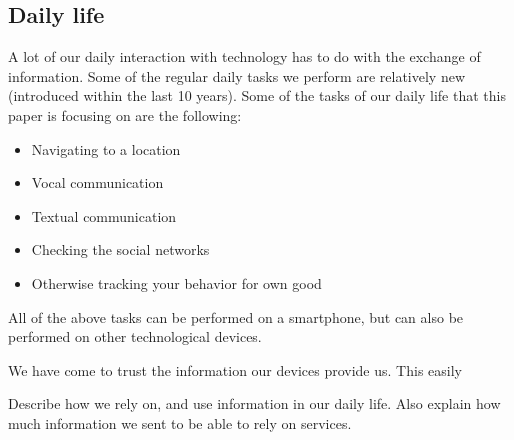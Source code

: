 \subsection{Daily life}
A lot of our daily interaction with technology has to do with the exchange of information. Some of the regular daily tasks we perform are relatively new (introduced within the last 10 years). Some of the tasks of our daily life that this paper is focusing on are the following:
\begin{itemize}
  \item{Navigating to a location}
  \item{Vocal communication}
  \item{Textual communication}
  \item{Checking the social networks}
  \item{Otherwise tracking your behavior for own good}
\end{itemize}

All of the above tasks can be performed on a smartphone, but can also be performed on other technological devices.

We have come to trust the information our devices provide us. This easily

Describe how we rely on, and use information in our daily life. Also explain how much information we sent to be able to rely on services.

